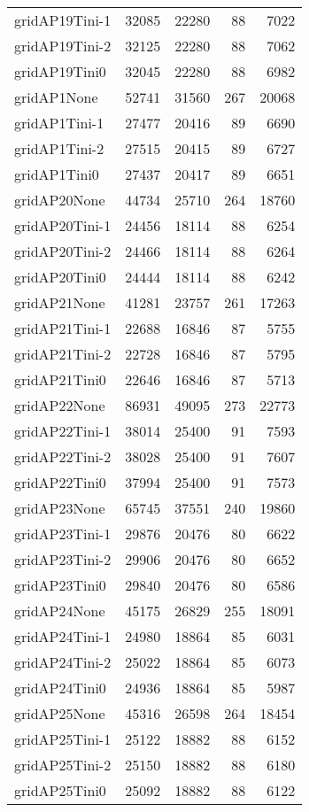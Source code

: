\begin{longtable}{lrrrr}
gridAP19Tini-1 & 32085 & 22280 & 88 & 7022 \\
gridAP19Tini-2 & 32125 & 22280 & 88 & 7062 \\
gridAP19Tini0 & 32045 & 22280 & 88 & 6982 \\
gridAP1None & 52741 & 31560 & 267 & 20068 \\
gridAP1Tini-1 & 27477 & 20416 & 89 & 6690 \\
gridAP1Tini-2 & 27515 & 20415 & 89 & 6727 \\
gridAP1Tini0 & 27437 & 20417 & 89 & 6651 \\
gridAP20None & 44734 & 25710 & 264 & 18760 \\
gridAP20Tini-1 & 24456 & 18114 & 88 & 6254 \\
gridAP20Tini-2 & 24466 & 18114 & 88 & 6264 \\
gridAP20Tini0 & 24444 & 18114 & 88 & 6242 \\
gridAP21None & 41281 & 23757 & 261 & 17263 \\
gridAP21Tini-1 & 22688 & 16846 & 87 & 5755 \\
gridAP21Tini-2 & 22728 & 16846 & 87 & 5795 \\
gridAP21Tini0 & 22646 & 16846 & 87 & 5713 \\
gridAP22None & 86931 & 49095 & 273 & 22773 \\
gridAP22Tini-1 & 38014 & 25400 & 91 & 7593 \\
gridAP22Tini-2 & 38028 & 25400 & 91 & 7607 \\
gridAP22Tini0 & 37994 & 25400 & 91 & 7573 \\
gridAP23None & 65745 & 37551 & 240 & 19860 \\
gridAP23Tini-1 & 29876 & 20476 & 80 & 6622 \\
gridAP23Tini-2 & 29906 & 20476 & 80 & 6652 \\
gridAP23Tini0 & 29840 & 20476 & 80 & 6586 \\
gridAP24None & 45175 & 26829 & 255 & 18091 \\
gridAP24Tini-1 & 24980 & 18864 & 85 & 6031 \\
gridAP24Tini-2 & 25022 & 18864 & 85 & 6073 \\
gridAP24Tini0 & 24936 & 18864 & 85 & 5987 \\
gridAP25None & 45316 & 26598 & 264 & 18454 \\
gridAP25Tini-1 & 25122 & 18882 & 88 & 6152 \\
gridAP25Tini-2 & 25150 & 18882 & 88 & 6180 \\
gridAP25Tini0 & 25092 & 18882 & 88 & 6122 \\

\end{longtable}

